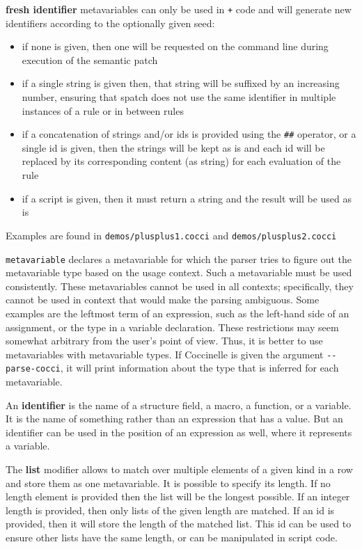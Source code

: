 {\bf fresh identifier} metavariables can only be used in {\tt +} code and will
generate new identifiers according to the optionally given seed:
\begin{itemize}
  \item if none is given, then one will be requested on the command line
    during execution of the semantic patch
  \item if a single string is given then, that string will be suffixed by an
    increasing number, ensuring that spatch does not use the same identifier
    in multiple instances of a rule or in between rules
  \item if a concatenation of strings and/or ids is provided using the
    {\tt \#\#} operator, or a single id is given, then the strings will be kept
    as is and each id will be replaced by its corresponding content (as string)
    for each evaluation of the rule
  \item if a script is given, then it must return a string and the result will be
    used as is
\end{itemize}
Examples are found in {\tt demos/plusplus1.cocci} and
{\tt demos/plusplus2.cocci} %

{\tt metavariable} declares a metavariable for which the parser tries to figure
out the metavariable type based on the usage context. Such a metavariable must
be used consistently. These metavariables cannot be used in all contexts;
specifically, they cannot be used in context that would make the parsing
ambiguous. Some examples are the leftmost term of an expression, such as the
left-hand side of an assignment, or the type in a variable declaration. These
restrictions may seem somewhat arbitrary from the user's point of view. Thus,
it is better to use metavariables with metavariable types. If Coccinelle is
given the argument {\tt -{}-parse-cocci}, it will print information about the
type that is inferred for each metavariable.

An {\bf identifier} is the name of a structure field, a macro, a function,
or a variable.  It is the name of something rather than an expression that
has a value.  But an identifier can be used in the position of an
expression as well, where it represents a variable.

The {\bf list} modifier allows to match over multiple elements of a given kind
in a row and store them as one metavariable. It is possible to specify its
length. If no length element is provided then the list will be the longest
possible. If an integer length is provided, then only lists of the given length
are matched. If an id is provided, then it will store the length of the matched
list. This id can be used to ensure other lists have the same length, or can be
manipulated in script code.

